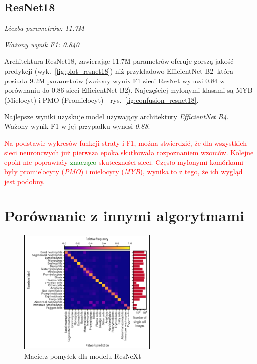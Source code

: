 \subsection{ResNet18}
\textit{Liczba parametrów: 11.7M}

\textit{Ważony wynik F1: 0.840}

Architektura ResNet18, zawierając 11.7M parametrów oferuje gorszą jakość predykcji (wyk.~\ref{fig:plot_resnet18}) niż przykładowo EfficientNet B2, która posiada 9.2M parametrów (ważony wynik F1 sieci ResNet wynosi 0.84 w porównaniu do 0.86 sieci EfficientNet B2).
Najczęściej mylonymi klasami są MYB (Mielocyt) i PMO (Promielocyt) - rys.~\ref{fig:confusion_resnet18}.

\newline
\newline
\newline

Najlepsze wyniki uzyskuje model używający architektury \textit{EfficientNet B4}.
Ważony wynik F1 w jej przypadku wynosi \textit{0.88}.

\textcolor{red}{
    Na podstawie wykresów funkcji straty i F1, można stwierdzić, że dla wszystkich sieci neuronowych już pierwsza epoka skutkowała rozpoznaniem wzorców.
    Kolejne epoki nie poprawiały \textcolor{green}{znacząco} skuteczności sieci.
    Często mylonymi komórkami były promielocyty (\textit{PMO}) i mielocyty (\textit{MYB}), wynika to z tego, że ich wygląd jest podobny.
}


\section{Porównanie z innymi algorytmami}

\begin{figure}
    \centering
    \includegraphics[width=0.6\textwidth]{resnext_confusion_matrix}
    \caption{Macierz pomyłek dla modelu ResNeXt \cite{resnext}}
    \label{fig:resnext_confusion_matrix}
\end{figure}

